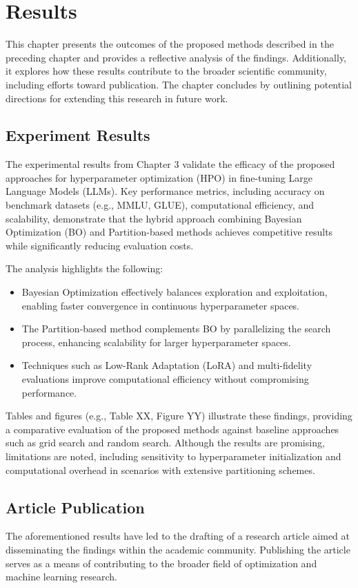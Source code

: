 \chapter{Results}
\label{chap:results}
This chapter presents the outcomes of the proposed methods described in the preceding chapter and provides a reflective analysis of the findings. Additionally, it explores how these results contribute to the broader scientific community, including efforts toward publication. The chapter concludes by outlining potential directions for extending this research in future work.

\section{Experiment Results}
\label{sec:exp_results}
The experimental results from Chapter 3 validate the efficacy of the proposed approaches for hyperparameter optimization (HPO) in fine-tuning Large Language Models (LLMs). Key performance metrics, including accuracy on benchmark datasets (e.g., MMLU, GLUE), computational efficiency, and scalability, demonstrate that the hybrid approach combining Bayesian Optimization (BO) and Partition-based methods achieves competitive results while significantly reducing evaluation costs.

The analysis highlights the following:
\begin{itemize}
    \item Bayesian Optimization effectively balances exploration and exploitation, enabling faster convergence in continuous hyperparameter spaces.
    \item The Partition-based method complements BO by parallelizing the search process, enhancing scalability for larger hyperparameter spaces.
    \item Techniques such as Low-Rank Adaptation (LoRA) and multi-fidelity evaluations improve computational efficiency without compromising performance.
\end{itemize}

Tables and figures (e.g., Table XX, Figure YY) illustrate these findings, providing a comparative evaluation of the proposed methods against baseline approaches such as grid search and random search. Although the results are promising, limitations are noted, including sensitivity to hyperparameter initialization and computational overhead in scenarios with extensive partitioning schemes.

\section{Article Publication}
\label{sec:article}
The aforementioned results have led to the drafting of a research article aimed at disseminating the findings within the academic community. Publishing the article serves as a means of contributing to the broader field of optimization and machine learning research.

